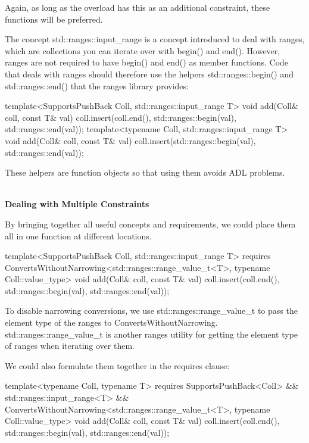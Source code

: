 Again, as long as the overload has this as an additional constraint, these functions will be preferred.

The concept std::ranges::input\_range is a concept introduced to deal with ranges, which are collections you can iterate over with begin() and end(). However, ranges are not required to have begin() and end() as member functions. Code that deals with ranges should therefore use the helpers std::ranges::begin() and std::ranges::end() that the ranges library provides:

\begin{cpp}
template<SupportsPushBack Coll, std::ranges::input_range T>
void add(Coll& coll, const T& val)
{
	coll.insert(coll.end(), std::ranges::begin(val), std::ranges::end(val));
}
template<typename Coll, std::ranges::input_range T>
void add(Coll& coll, const T& val)
{
	coll.insert(std::ranges::begin(val), std::ranges::end(val));
}
\end{cpp}

These helpers are function objects so that using them avoids ADL problems.

\noindent
\hspace*{\fill} \\ %
\textbf{Dealing with Multiple Constraints}

By bringing together all useful concepts and requirements, we could place them all in one function at different locations.

\begin{cpp}
template<SupportsPushBack Coll, std::ranges::input_range T>
requires ConvertsWithoutNarrowing<std::ranges::range_value_t<T>,
typename Coll::value_type>
void add(Coll& coll, const T& val)
{
	coll.insert(coll.end(),
				std::ranges::begin(val), std::ranges::end(val));
}
\end{cpp}

To disable narrowing conversions, we use std::ranges::range\_value\_t to pass the element type of the ranges to ConvertsWithoutNarrowing. std::ranges::range\_value\_t is another ranges utility for getting the element type of ranges when iterating over them.

We could also formulate them together in the requires clause:

\begin{cpp}
template<typename Coll, typename T>
requires SupportsPushBack<Coll> &&
			std::ranges::input_range<T> &&
			ConvertsWithoutNarrowing<std::ranges::range_value_t<T>,
							typename Coll::value_type>
void add(Coll& coll, const T& val)
{
	coll.insert(coll.end(),
				std::ranges::begin(val), std::ranges::end(val));
}
\end{cpp}

